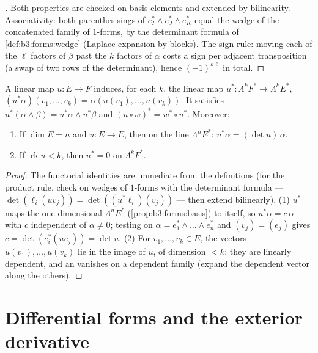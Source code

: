 \begin{proof}[\omnameProof]
Both properties are checked on basis elements and extended by
bilinearity. Associativity: both parenthesisings of
$e_I^* \wedge e_J^* \wedge e_K^*$ equal the wedge of the
concatenated family of $1$-forms, by the determinant formula
of \cref{def:b3:forms:wedge} (Laplace expansion by blocks).
The sign rule: moving each of the $\ell$ factors of $\beta$
past the $k$ factors of $\alpha$ costs a sign per adjacent
transposition (a swap of two rows of the determinant), hence
$(-1)^{k\ell}$ in total.
\end{proof}

\begin{proposition}
\label{prop:b3:forms:linearpullback}
A linear map $u\colon E \to F$ induces, for each $k$, the
linear map $u^*\colon \Lambda^kF^* \to \Lambda^kE^*$,
$(u^*\alpha)(v_1, \dots, v_k) = \alpha(u(v_1), \dots,
u(v_k))$. It satisfies $u^*(\alpha \wedge \beta) = u^*\alpha
\wedge u^*\beta$ and $(u \circ w)^* = w^* \circ u^*$.
Moreover:
\begin{enumerate}
  \item If $\dim E = n$ and $u\colon E \to E$, then on the
        line $\Lambda^nE^*$: $u^*\alpha = (\det u)\,\alpha$.
  \item If $\operatorname{rk}u < k$, then $u^* = 0$ on
        $\Lambda^kF^*$.
\end{enumerate}
\end{proposition}

\begin{proof}
The functorial identities are immediate from the definitions
(for the product rule, check on wedges of $1$-forms with the
determinant formula --- $\det(\ell_i(uv_j)) =
\det((u^*\ell_i)(v_j))$ --- then extend bilinearly).
(1) $u^*$ maps the one-dimensional $\Lambda^nE^*$
(\cref{prop:b3:forms:basis}) to itself, so $u^*\alpha =
c\,\alpha$ with $c$ independent of $\alpha \neq 0$; testing
on $\alpha = e_1^* \wedge \dots \wedge e_n^*$ and $(v_j) =
(e_j)$ gives $c = \det(e_i^*(ue_j)) = \det u$.
(2) For $v_1, \dots, v_k \in E$, the vectors $u(v_1), \dots,
u(v_k)$ lie in the image of $u$, of dimension $< k$: they are
linearly dependent, and an  vanishes on a
dependent family (expand the dependent vector along the
others).
\end{proof}

\section{Differential forms and the exterior derivative}

